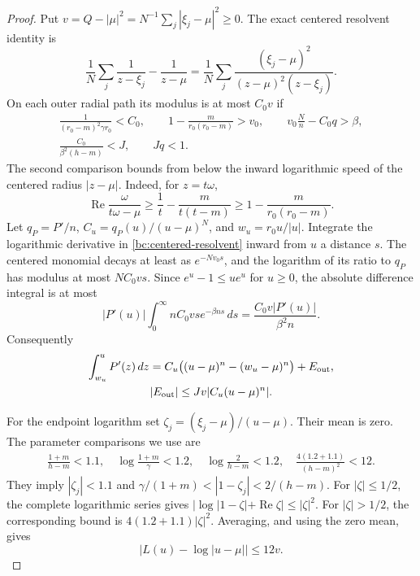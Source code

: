 \documentclass[11pt,reqno]{amsart}
\numberwithin{equation}{section}
\theoremstyle{definition}
\theoremstyle{remark}
\renewcommand{\Re}{\operatorname{Re}}
\begin{document}
\begin{proof}
Put $v=Q-|\mu|^2=N^{-1}\sum_j|\xi_j-\mu|^2\geq0$.
The exact centered resolvent identity is
\begin{equation}\label{bc:centered-resolvent}
 \frac1N\sum_j\frac1{z-\xi_j}-\frac1{z-\mu}
 =\frac1N\sum_j
 \frac{(\xi_j-\mu)^2}{(z-\mu)^2(z-\xi_j)}.
\end{equation}
On each outer radial path its modulus is at most $C_0v$ if
\begin{equation}\label{bc:outer-gates}
\begin{gathered}
 \frac1{(r_0-m)^2\gamma r_0}<C_0,\qquad
 1-\frac{m}{r_0(r_0-m)}>v_0,\qquad
 v_0\frac Nn-C_0q>\beta,\\
 \frac{C_0}{\beta^2(h-m)}<J,\qquad Jq<1.
\end{gathered}
\end{equation}
The second comparison bounds from below the inward logarithmic speed
of the centered radius $|z-\mu|$.  Indeed, for $z=t\omega$,
\[
 \Re\frac\omega{t\omega-\mu}
 \geq\frac1t-\frac{m}{t(t-m)}
 \geq1-\frac{m}{r_0(r_0-m)}.
\]
Let $q_P=P'/n$, $C_u=q_P(u)/(u-\mu)^N$, and
$w_u=r_0u/|u|$.  Integrate the logarithmic derivative in
\eqref{bc:centered-resolvent} inward from $u$ a distance $s$.
The centered monomial decays at least as $e^{-Nv_0s}$, and the
logarithm of its ratio to $q_P$ has modulus at most
$NC_0vs$.  Since $e^u-1\leq ue^u$ for $u\geq0$, the
absolute difference integral is at most
\[
 |P'(u)|\int_0^\infty nC_0vs e^{-\beta ns}\,ds
 =\frac{C_0v|P'(u)|}{\beta^2n}.
\]
Consequently
\begin{equation}\label{bc:outer-primitive}
\begin{gathered}
 \int_{w_u}^uP'(z)\,dz
 =C_u\bigl((u-\mu)^n-(w_u-\mu)^n\bigr)+E_{\rm out},\\
 |E_{\rm out}|\leq Jv|C_u(u-\mu)^n|.
\end{gathered}
\end{equation}

For the endpoint logarithm set $\zeta_j=(\xi_j-\mu)/(u-\mu)$.
Their mean is zero.  The parameter comparisons we use are
\begin{equation}\label{bc:endpoint-log-gates}
\begin{gathered}
 \frac{1+m}{h-m}<1.1,\quad
 \log\frac{1+m}{\gamma}<1.2,\quad
 \log\frac2{h-m}<1.2,\quad
 \frac{4(1.2+1.1)}{(h-m)^2}<12.
\end{gathered}
\end{equation}
They imply $|\zeta_j|<1.1$ and
$\gamma/(1+m)<|1-\zeta_j|<2/(h-m)$.
For $|\zeta|\leq1/2$, the complete logarithmic series gives
$|\log|1-\zeta|+\Re\zeta|\leq|\zeta|^2$.
For $|\zeta|>1/2$, the corresponding bound is
$4(1.2+1.1)|\zeta|^2$.  Averaging, and using the zero mean,
gives
\begin{equation}\label{bc:centered-log}
 |L(u)-\log|u-\mu||\leq12v.
\end{equation}


\end{proof}
\end{document}
